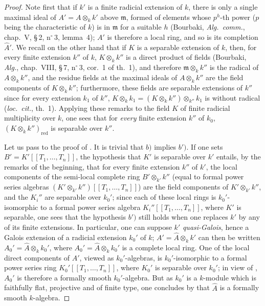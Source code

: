 \begin{proof}
Note first that if $k'$ is a finite radicial extension of $k$, there is only a single maximal ideal of $A'=A\otimes_k k'$ above $\mathfrak{m}$, formed of elements whose $p^h$-th power ($p$ being the characteristic of $k$) is in $\mathfrak{m}$ for a suitable $h$ (Bourbaki, \emph{Alg.\ comm.}, chap.~V, \S\,2, n$^\circ$\,3, lemma~4);
$A'$ is therefore a local ring, and so is its completion $\widehat{A}'$.
We recall on the other hand that if $K$ is a separable extension of $k$, then, for every finite extension $k''$ of $k$, $K\otimes_k k''$ is a direct product of fields (Bourbaki, \emph{Alg.}, chap.~VIII, \S\,7, n$^\circ$\,3, cor.~1 of th.~1), and therefore $\mathfrak{m}\otimes_k k''$ is the radical of $A\otimes_k k''$, and the residue fields at the maximal ideals of $A\otimes_k k''$ are the field components of $K\otimes_k k''$; furthermore, these fields are separable extensions of $k''$ since for every extension $k_1$ of $k''$, $K\otimes_k k_1=(K\otimes_k k'')\otimes_{k''}k_1$ is without radical (\emph{loc.\ cit.}, th.~1).
Applying these remarks to the field $K$ of finite radicial multiplicity over $k$, one sees that for \emph{every} finite extension $k''$ of $k_0$, $(K\otimes_k k'')_{\mathrm{red}}$ is separable over $k''$.

Let us pass to the proof of .
It is trivial that $b)$ implies $b')$.
If one sets $B'=K'[[T_1,\ldots,T_n]]$, the hypothesis that $K'$ is separable over $k'$ entails, by the remarks of the beginning, that for every finite extension $k''$ of $k'$, the local components of the semi-local complete ring $B'\otimes_{k'} k''$ (equal to formal power series algebras $(K'\otimes_{k'}k'')[[T_1,\ldots,T_n]]$) are the field components of $K'\otimes_{k'}k''$, and the $K_i''$ are separable over $k_0'$; since each of these local rings is $k_0'$-isomorphic to a formal power series algebra $K_i''[[T_1,\ldots,T_n]]$, where $K'$ is separable, one sees that the hypothesis $b')$ still holds when one replaces $k'$ by any of its finite extensions.
In particular, one can suppose $k'$ \emph{quasi-Galois}, hence a Galois extension of a radicial extension $k_0'$ of $k$;
$A'=\widehat{A}\otimes_k k'$ can then be written $A_0'=\widehat{A}\otimes_k k_0'$, where $A_0'=\widehat{A}\otimes_k k_0'$ is a complete local ring.
One of the local direct components of $A'$, viewed as $k_0'$-algebras, is $k_0'$-isomorphic to a formal power series ring $K_0'[[T_1,\ldots,T_n]]$, where $K_0'$ is separable over $k_0'$;
in view of , $A_0'$ is therefore a formally smooth $k_0'$-algebra.
But as $k_0'$ is a $k$-module which is faithfully flat, projective and of finite type, one concludes by  that $\widehat{A}$ is a formally smooth $k$-algebra.


\end{proof}
